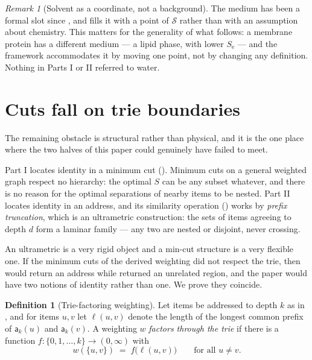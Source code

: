 \documentclass[11pt,twocolumn,a4paper]{article}
\theoremstyle{thmstyle}
\theoremstyle{definition}
\newtheorem{definition}[theorem]{Definition}
\theoremstyle{remark}
\newtheorem{remark}[theorem]{Remark}
\newcommand{\wt}{w}
\newcommand{\Se}{S_{\mathrm{e}}}
\newcommand{\Sspace}{\mathcal{S}}
\newcommand{\addr}{\mathsf{a}}
\begin{document}
\begin{remark}[Solvent as a coordinate, not a background]
The medium has been a formal slot since , and
 fills it with a point of $\Sspace$ rather
than with an assumption about chemistry. This matters for the
generality of what follows: a membrane protein has a different medium
--- a lipid phase, with lower $\Se$ --- and the framework accommodates
it by moving one point, not by changing any definition. Nothing in
Parts I or II referred to water.
\end{remark}

\section{Cuts fall on trie boundaries}
\label{sec:identity-proof}

The remaining obstacle is structural rather than physical, and it is
the one place where the two halves of this paper could genuinely have
failed to meet.

Part I locates identity in a minimum cut ().
Minimum cuts on a general weighted graph respect no hierarchy: the
optimal $S$ can be any subset whatever, and there is no reason for the
optimal separations of nearby items to be nested. Part II locates
identity in an address, and its similarity operation
() works by \emph{prefix truncation}, which is an
ultrametric construction: the sets of items agreeing to depth $d$ form
a laminar family --- any two are nested or disjoint, never crossing.

An ultrametric is a very rigid object and a min-cut structure is a very
flexible one. If the minimum cuts of the derived weighting did not
respect the trie, then  would return an address
while  returned an unrelated region, and the
paper would have two notions of identity rather than one. We prove
they coincide.

\begin{definition}[Trie-factoring weighting]
\label{def:trie-factoring}
Let items be addressed to depth $k$ as in , and for
items $u,v$ let $\ell(u,v)$ denote the length of the longest common
prefix of $\addr_k(u)$ and $\addr_k(v)$. A weighting $\wt$
\emph{factors through the trie} if there is a function
$f \colon \{0,1,\dots,k\} \to (0,\infty)$ with
\begin{equation}
  \wt(\{u,v\}) \;=\; f\bigl(\ell(u,v)\bigr)
  \qquad\text{for all } u \neq v .
  \label{eq:trie-factoring}
\end{equation}
\end{definition}
\end{document}

